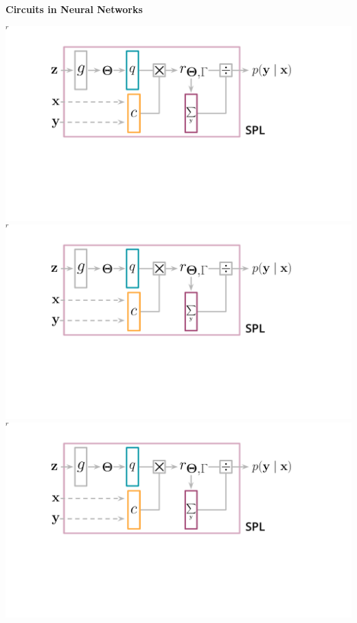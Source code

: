 \documentclass[aspectratio=169]{beamer}
\begin{document}
\begin{frame}[fragile]{\textbf{Circuits in Neural Networks}}

\vspace{0.25cm}

\begin{center}
  \includegraphics[width=.27\columnwidth,page=2,trim=15 200 360 5,clip]{figures/spl-circ}\hfill
  \includegraphics[width=.27\columnwidth,page=3,trim=15 200 380 5,clip]{figures/spl-circ}\hfill
  \includegraphics[width=.4\columnwidth,page=1,trim=95 160 120 30,clip]{figures/spl-circ}\\[-5pt]

  \vspace{0.5cm}


\end{center}
\end{frame}
\end{document}
